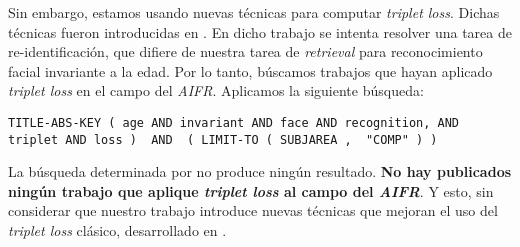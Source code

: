 Sin embargo, estamos usando nuevas técnicas para computar \textit{triplet loss}. Dichas técnicas fueron introducidas en \cite{informatica:principal}. En dicho trabajo se intenta resolver una tarea de re-identificación, que difiere de nuestra tarea de \textit{retrieval} para reconocimiento facial invariante a la edad. Por lo tanto, búscamos trabajos que hayan aplicado \textit{triplet loss} en el campo del \textit{AIFR}. Aplicamos la siguiente búsqueda:

\begin{lstlisting}[caption=Keywords usandos para la búsqueda de trabajos que combinen \textit{AIFR} y \textit{triplet loss} en \textit{SCOPUS}, label=code:scopus_search_especifico]
    TITLE-ABS-KEY ( age AND invariant AND face AND recognition, AND triplet AND loss )  AND  ( LIMIT-TO ( SUBJAREA ,  "COMP" ) )
\end{lstlisting}

La búsqueda determinada por  no produce ningún resultado. \textbf{No hay publicados ningún trabajo que aplique \textit{triplet loss} al campo del \textit{AIFR}}. Y esto, sin considerar que nuestro trabajo introduce nuevas técnicas que mejoran el uso del \textit{triplet loss} clásico, desarrollado en .


